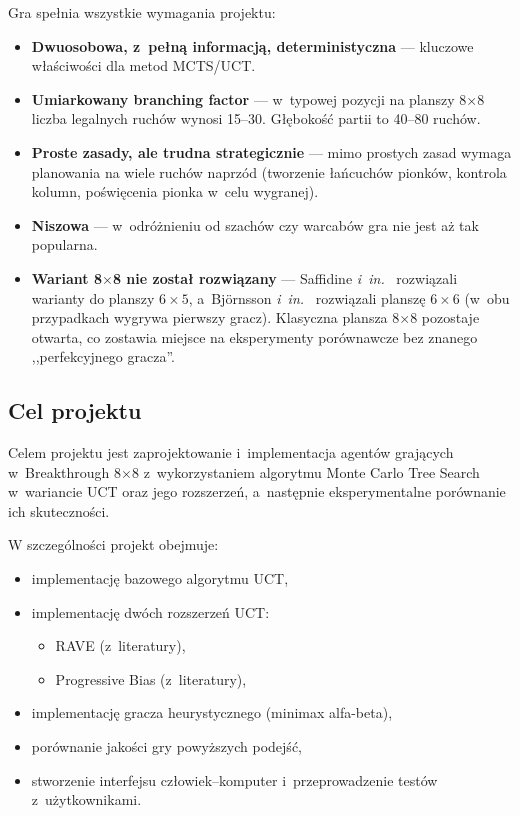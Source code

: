 \documentclass[12pt,a4paper]{article}
\begin{document}
Gra spełnia wszystkie wymagania projektu:
\begin{itemize}[leftmargin=2em]
  \item \textbf{Dwuosobowa, z~pełną informacją, deterministyczna} --- kluczowe właściwości dla metod MCTS/UCT.
  \item \textbf{Umiarkowany branching factor} --- w~typowej pozycji na planszy 8$\times$8 liczba legalnych ruchów wynosi 15--30. Głębokość partii to 40--80 ruchów.
  \item \textbf{Proste zasady, ale trudna strategicznie} --- mimo prostych zasad wymaga planowania na wiele ruchów naprzód (tworzenie łańcuchów pionków, kontrola kolumn, poświęcenia pionka w~celu wygranej).
  \item \textbf{Niszowa} --- w~odróżnieniu od szachów czy warcabów gra nie jest aż tak popularna.
  \item \textbf{Wariant 8$\times$8 nie został rozwiązany} --- Saffidine \textit{i~in.}~\cite{saffidine2011solving} rozwiązali warianty do planszy $6\times5$, a~Björnsson \textit{i~in.}~\cite{bjornsson2026solving} rozwiązali planszę $6\times6$ (w~obu przypadkach wygrywa pierwszy gracz). Klasyczna plansza 8$\times$8 pozostaje otwarta, co zostawia miejsce na eksperymenty porównawcze bez znanego ,,perfekcyjnego gracza''.
\end{itemize}

\subsection{Cel projektu}

Celem projektu jest zaprojektowanie i~implementacja agentów grających w~Breakthrough 8$\times$8 z~wykorzystaniem algorytmu Monte Carlo Tree Search w~wariancie UCT oraz jego rozszerzeń, a~następnie eksperymentalne porównanie ich skuteczności.

W szczególności projekt obejmuje:
\begin{itemize}[leftmargin=2em]
  \item implementację bazowego algorytmu UCT,
  \item implementację dwóch rozszerzeń UCT:
        \begin{itemize}
          \item RAVE (z~literatury),
          \item Progressive Bias (z~literatury),
        \end{itemize}
  \item implementację gracza heurystycznego (minimax alfa-beta),
  \item porównanie jakości gry powyższych podejść,
  \item stworzenie interfejsu człowiek--komputer i~przeprowadzenie testów z~użytkownikami.
\end{itemize}
\end{document}
